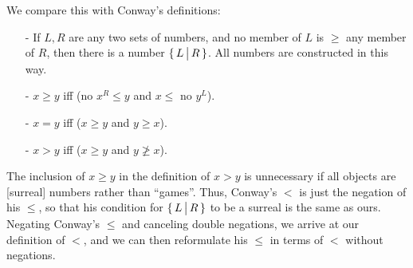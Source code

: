 \noindent
We compare this with Conway's definitions:
\begin{itemize}\footnotesize
\item[-] If $L,R$ are any two sets of numbers, and no member of $L$ is $\ge$ any member of $R$, then there is a number $\{\,L\,\big|\,R\,\}$.
  All numbers are constructed in this way.
\item[-] $x\ge y$ iff (no $x^R\le y$ and $x\le$ no $y^L$).
\item[-] $x=y$ iff ($x \ge y$ and $y\ge x$).
\item[-] $x>y$ iff ($x\ge y$ and $y\not\ge x$).
\end{itemize}
The inclusion of $x\ge y$ in the definition of $x>y$ is unnecessary if all objects are [surreal] numbers rather than ``games''.
Thus, Conway's $<$ is just the negation of his $\le$, so that his condition for $\{\,L\,\big|\,R\,\}$ to be a surreal is the same as ours.
Negating Conway's $\le$ and canceling double negations, we arrive at our definition of $<$, and we can then reformulate his $\le$ in terms of $<$ without negations.

